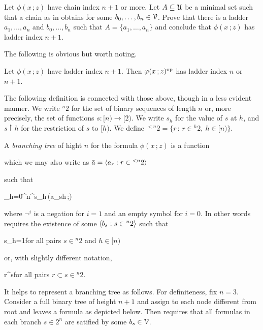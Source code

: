 \documentclass[scombinatorics.tex]{subfiles}
\begin{document}
\begin{exercise}
  Let $\phi(x\,;z)$ have chain index $n+1$ or more. 
  Let $A\subseteq\U$ be a minimal set such that a chain as in  obtains for some $b_0,\dots,b_n\in\V$.
  Prove that there is a ladder $a_1,\dots,a_n$ and $b_0,\dots,b_n$ such that $A=\{a_1,\dots,a_n\}$ and conclude that $\phi(x\,;z)$ has ladder index $n+1$.\QED
\end{exercise}

The following is obvious but worth noting.

\begin{fact}\label{fact_stability_dual}
  Let $\phi(x\,;z)$ have ladder index $n+1$. 
  Then $\phi(x\,;z)^{\rm op}$ has ladder index $n$ or $n+1$.\QED
\end{fact}
 
The following definition is connected with those above, though in a less evident manner.
We write ${}^n2$ for the set of binary sequences of length $n$ or, more precisely, the set of functions $s:[n)\to[2)$.
We write $s_h$ for the value of $s$ at $h$, and $s{\restriction} h$ for the restriction of $s$ to $[h)$.
We define ${}^{<n}2=\big\{r\, :\, r\in {}^h2,\ h\in[n)\big\}$.

A \emph{branching tree\/} of hight $n$ for the formula $\phi(x\,;z)$ is a function 

\nopagebreak[4]\par
{}\hfill which we may also write as $\bar a=\<a_r:r\in{}^{<n}2\>$

such that

{\neq}
{\bigcap_{h=0}^n\neg^{s_h}\,\phi(a_{s\restriction h}\,;\V)}

where $\neg^i$ is a negation for $i=1$ and an empty symbol for $i=0$.
In other words  requires the existence of some $\<b_s:s\in{}^n2\>$ such that

{\IFF}
{s_h=1}\hfill for all pairs $s\in {}^n2$ and $h\in[n)$

or, with slightly different notation,

{\IFF}
{r^\subseteq s}\hfill for all pairs $r\subset s\in {}^n2$.

It helps to represent a branching tree as follows.
For definiteness, fix $n=3$.
Consider a full binary tree of height $n+1$ and assign to each node different from root and leaves a formula as depicted below.
Then  requires that all formulas in each branch $s\in2^n$ are satified by some $b_s\in\V$.
\medskip
\end{document}
